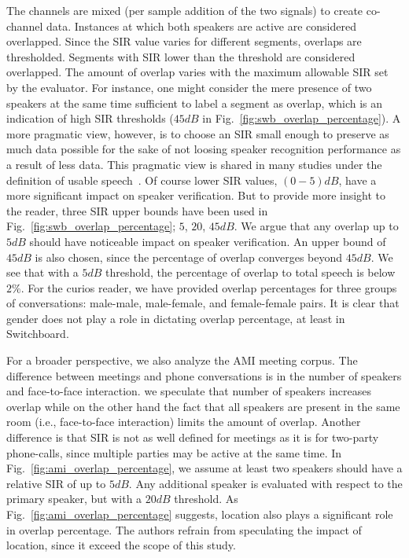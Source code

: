 \documentclass[journal]{IEEEtran}
\begin{document}
The channels are mixed (per sample addition of the two signals) to create co-channel data. 
Instances at which both speakers are active are considered overlapped. 
Since the SIR value varies for different segments, overlaps are thresholded. 
Segments with SIR lower than the threshold are considered overlapped.
The amount of overlap varies with the maximum allowable SIR set by the evaluator. 
For instance, one might consider the mere presence of two speakers at the same time sufficient to label a segment as overlap, which is an indication of high SIR thresholds ($45dB$ in Fig.~\ref{fig:swb_overlap_percentage}). 
A more pragmatic view, however, is to choose an SIR small enough to preserve as much data possible for the sake of not loosing speaker recognition performance as a result of less data. 
This pragmatic view is shared in many studies under the definition of usable speech~\cite{yantorno}. 
Of course lower SIR values, $(0-5) dB$, have a more significant impact on speaker verification. But to provide more insight to the reader, three SIR upper bounds have been used in Fig.~\ref{fig:swb_overlap_percentage}; $5$, $20$, $45dB$. 
We argue that any overlap up to $5dB$ should have noticeable impact on speaker verification. 
An upper bound of $45dB$ is also chosen, since the percentage of overlap converges beyond $45dB$. 
We see that with a $5dB$ threshold, the percentage of overlap to total speech is below $2\%$. 
For the curios reader, we have provided overlap percentages for three groups of conversations: male-male, male-female, and female-female pairs. 
It is clear that gender does not play a role in dictating overlap percentage, at least in Switchboard.  

For a broader perspective, we also analyze the AMI meeting corpus. 
The difference between meetings and phone conversations is in the number of speakers and face-to-face interaction. 
we speculate that number of speakers increases overlap while on the other hand the fact that all speakers are present in the same room (i.e., face-to-face interaction) limits the amount of overlap. 
Another difference is that SIR is not as well defined for meetings as it is for two-party phone-calls, since multiple parties may be active at the same time. 
In Fig.~\ref{fig:ami_overlap_percentage}, we assume at least two speakers should have a relative SIR of up to $5dB$. 
Any additional speaker is evaluated with respect to the primary speaker, but with a $20dB$ threshold. 
As Fig.~\ref{fig:ami_overlap_percentage} suggests, location also plays a significant role in overlap percentage. 
The authors refrain from speculating the impact of location, since it exceed the scope of this study. 
\end{document}
